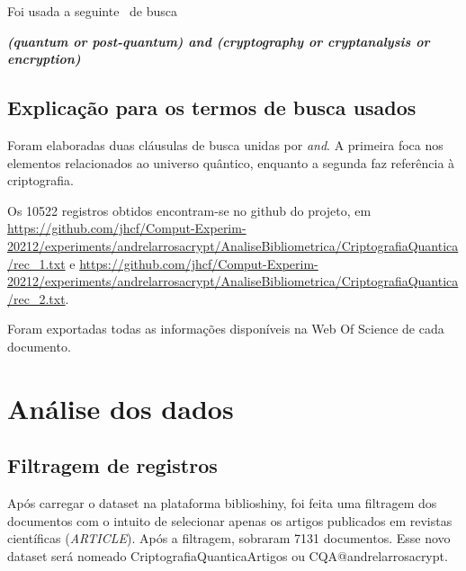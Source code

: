 Foi usada a seguinte \query\  de busca

\textit{\textbf{(quantum or  post-quantum) and (cryptography or cryptanalysis or encryption)}}




\subsection{Explicação para os termos de busca usados}

Foram elaboradas duas cláusulas de busca unidas por \textit{and}. A primeira foca nos elementos relacionados ao universo quântico, enquanto a segunda faz referência à criptografia.

Os 10522 registros obtidos encontram-se no github do projeto, em \url{https://github.com/jhcf/Comput-Experim-20212/experiments/andrelarrosacrypt/AnaliseBibliometrica/CriptografiaQuantica/rec_1.txt} e \url{https://github.com/jhcf/Comput-Experim-20212/experiments/andrelarrosacrypt/AnaliseBibliometrica/CriptografiaQuantica/rec_2.txt}. 

Foram exportadas todas as informações disponíveis na Web Of Science de cada documento.

\section{Análise dos dados}

\subsection{Filtragem de registros}


Após carregar o dataset na plataforma biblioshiny, foi feita uma filtragem dos documentos com o intuito de selecionar apenas os artigos publicados em revistas científicas (\textit{ARTICLE}). Após a filtragem, sobraram 7131 documentos. Esse novo dataset será nomeado CriptografiaQuanticaArtigos ou CQA@andrelarrosacrypt.

